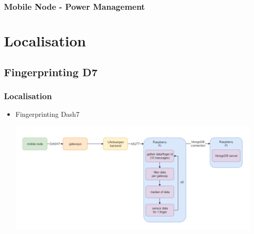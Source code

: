 \begin{frame}[fragile]
\frametitle{Mobile Node - Power Management} 
\begin{figure}
  \centering
  \qquad
\end{figure}
\end{frame}


\section{Localisation}

\subsection{Fingerprinting D7}
\begin{frame} 
\frametitle{Localisation}
\begin{itemize}
\item Fingerprinting Dash7
	\begin{center}
  		\includegraphics[width=\textwidth]{images/Flowchart.png}
	\end{center}
\end{itemize}
\end{frame}

